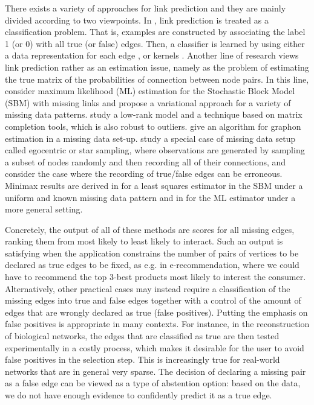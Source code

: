 \documentclass[a4paper, 11pt]{article}
\theoremstyle{remark}
\begin{document}
 
There exists a variety of approaches for link prediction and they are mainly divided according to two viewpoints. In \cite{benhur05, bleakley07, li13, zhang2018link}, link prediction is treated as a classification problem.  That is, examples are constructed by associating the label 1 (or 0) with all true (or false) edges. Then, a classifier is learned by using either a data representation for each edge \citep{zhang2018link}, or kernels \citep{benhur05, bleakley07, li13}. %
Another line of research views link prediction rather as an estimation issue, namely as the problem of estimating the true matrix of the probabilities of connection between node pairs. 
In this line, \cite{chiquet20} consider maximum likelihood (ML) estimation for the Stochastic Block Model (SBM) with missing links and propose a variational approach for a variety of missing data patterns.  
\cite{gaucher21} study a low-rank model and a technique based on matrix completion tools, which is also robust to outliers. \cite{mukherjee19} give an algorithm for graphon estimation in a missing data set-up. \cite{levina23} study a special case of missing data setup called egocentric or star sampling, where observations are generated by sampling a subset of nodes randomly and then recording all of their connections, and \cite{levina17} consider the case where the recording of true/false edges can be erroneous. 
Minimax results are derived in \cite{gao2016optimal} for a least squares estimator in the SBM under a uniform and known missing data pattern and in \cite{gaucher2021maximum} for the ML estimator under a more general setting.



Concretely, the output of all of these methods are scores for all missing edges, ranking them from most likely to least likely to interact. 
Such an output is satisfying when the application constrains the number of pairs of vertices to be declared as true edges to be fixed, as e.g. in e-recommendation, where we could have to recommend the top 3-best products most likely to interest the consumer. Alternatively, other practical cases may instead require a classification of the missing edges into true and false edges together with a control of the amount of edges that are wrongly declared as true (false positives). Putting the emphasis on false positives is appropriate in many contexts.
For instance, in the reconstruction of biological networks, the edges that are classified as true are then tested experimentally in a costly process, which makes it desirable for the user to avoid false positives in the selection step. 
This is increasingly true for real-world networks that are in general very sparse. The decision of declaring a missing pair as a false edge can be viewed as a type of abstention option: based on the data, we do not have enough evidence to confidently predict it as a true edge.
\end{document}
